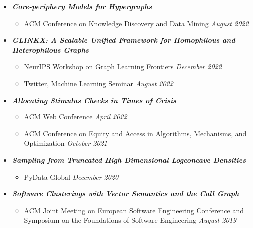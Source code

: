 \documentclass[margin]{res}
\newcommand{\bemph}[1]{\textbf{\emph{#1}}}
\begin{document}
\begin{resume}
\begin{itemize}[nosep]
	\item \bemph{Core-periphery Models for Hypergraphs}
	\begin{itemize}[nosep]
		\item ACM Conference on Knowledge Discovery and Data Mining \hfill \emph{August 2022}
	\end{itemize}
	
	\item \bemph{GLINKX: A Scalable Unified Framework for Homophilous and Hetero\-philous Graphs}
	\begin{itemize}[nosep]
		\item NeurIPS Workshop on Graph Learning Frontiers  \hfill \emph{December 2022}
		\item Twitter, Machine Learning Seminar \hfill \emph{August 2022}
		
	\end{itemize}

 
	\item \bemph{Allocating Stimulus Checks in Times of Crisis} 
	\begin{itemize}[nosep]
		\item ACM Web Conference \hfill \emph{April 2022}
		\item ACM Conference on Equity and Access in Algorithms, Mechanisms, and Optimization \hfill \emph{October 2021}
	\end{itemize}

	\item \bemph{Sampling from Truncated High Dimensional Logconcave Densities}
	\begin{itemize}[nosep]
		\item PyData Global \hfill \emph{December 2020}
	\end{itemize}
	
	\item \bemph{Software Clusterings with Vector Semantics and the Call Graph}
	\begin{itemize}[nosep]
		\item ACM Joint Meeting on European Software Engineering Conference and Symposium on the Foundations of Software Engineering \hfill \emph{August 2019}
	\end{itemize} 
	
\end{itemize}


\end{resume}
\end{document}

